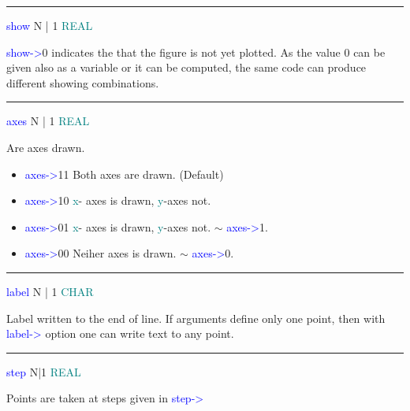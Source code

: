 \vspace{0.3cm} 
\hrule 
\vspace{0.3cm} 
\noindent \textcolor{blue}{show} \tabto{3cm}  N | 1  \tabto{5cm}   \textcolor{teal}{REAL}  \tabto{7cm} 
\begin{changemargin}{3cm}{0cm} 
\noindent  \textcolor{blue}{show->}0 indicates the that the figure is not yet plotted. 
As the value 0 can be given also as a variable or it can be computed, 
the same code can produce different showing combinations. 
\end{changemargin} 
\vspace{0.3cm} 
\hrule 
\vspace{0.3cm} 
\noindent \textcolor{blue}{axes}  \tabto{3cm}  N | 1  \tabto{5cm}  \textcolor{teal}{REAL}  \tabto{7cm} 
\begin{changemargin}{3cm}{0cm} 
\noindent  Are axes drawn. 
\begin{itemize} 
\item \textcolor{blue}{axes->}11 Both axes are drawn. (Default) 
\item \textcolor{blue}{axes->}10 \textcolor{teal}{x}- axes is  drawn, \textcolor{teal}{y}-axes not. 
\item \textcolor{blue}{axes->}01 \textcolor{teal}{x}- axes is  drawn, \textcolor{teal}{y}-axes not. $\sim$ \textcolor{blue}{axes->}1. 
\item \textcolor{blue}{axes->}00 Neiher axes is drawn. $\sim$ \textcolor{blue}{axes->}0. 
\end{itemize} 
\end{changemargin} 
\vspace{0.3cm} 
\hrule 
\vspace{0.3cm} 
\noindent \textcolor{blue}{label}  \tabto{3cm}  N | 1  \tabto{5cm}   \textcolor{teal}{CHAR}  \tabto{7cm} 
\begin{changemargin}{3cm}{0cm} 
\noindent  Label written to the end of line. If arguments define only one point, 
then with \textcolor{blue}{label->} option one can write text to any point. 
\end{changemargin} 
\vspace{0.3cm} 
\hrule 
\vspace{0.3cm} 
\noindent \textcolor{blue}{step} \tabto{3cm} N|1 \tabto{5cm}  \textcolor{teal}{REAL} \tabto{7cm} 
\begin{changemargin}{3cm}{0cm} 
\noindent  Points are taken at steps given in \textcolor{blue}{step->} 
 
\end{changemargin} 

